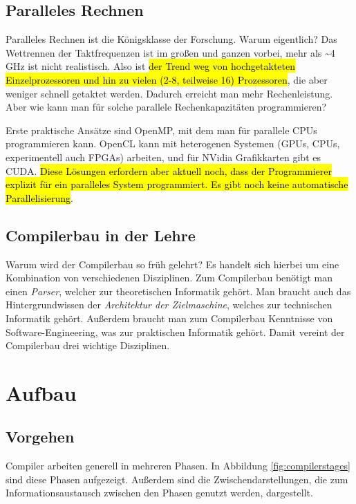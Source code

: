 \documentclass[ngerman]{scrartcl}
\begin{document}
\subsection{Paralleles Rechnen}

Paralleles Rechnen ist die Königsklasse der Forschung. Warum eigentlich? Das Wettrennen der Taktfrequenzen ist im großen und ganzen vorbei, mehr als \textasciitilde4\,GHz ist nicht realistisch. Also ist \hl{der Trend weg von hochgetakteten Einzelprozessoren und hin zu vielen (2-8, teilweise 16) Prozessoren}, die aber weniger schnell getaktet werden. Dadurch erreicht man mehr Rechenleistung. Aber wie kann man für solche parallele Rechenkapazitäten programmieren?

Erste praktische Ansätze sind OpenMP, mit dem man für parallele CPUs programmieren kann. {OpenCL} kann mit heterogenen Systemen (GPUs, CPUs, experimentell auch FPGAs) arbeiten, und für NVidia Grafikkarten gibt es {CUDA}. \hl{Diese Lösungen erfordern aber aktuell noch, dass der Programmierer explizit für ein paralleles System programmiert. Es gibt noch keine automatische Parallelisierung}.

\subsection{Compilerbau in der Lehre}

Warum wird der Compilerbau so früh gelehrt? Es handelt sich hierbei um eine Kombination von verschiedenen Disziplinen. Zum Compilerbau benötigt man einen \emph{Parser}, welcher zur theoretischen Informatik gehört. Man braucht auch das Hintergrundwissen der \emph{Architektur der Zielmaschine}, welches zur technischen Informatik gehört. Außerdem braucht man zum Compilerbau Kenntnisse von Software-Engineering, was zur praktischen Informatik gehört. Damit vereint der Compilerbau drei wichtige Disziplinen.

\section{Aufbau}

\subsection{Vorgehen}

Compiler arbeiten generell in mehreren Phasen. In Abbildung \ref{fig:compilerstages} sind diese Phasen aufgezeigt. Außerdem sind die  Zwischendarstellungen, die zum Informationsaustausch zwischen den Phasen genutzt werden, dargestellt.
\end{document}
